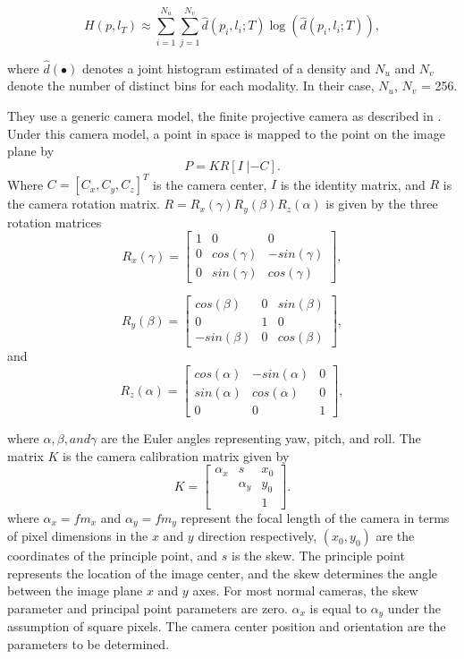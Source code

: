\begin{equation}
H(p, l_T) \approx  \sum_{i=1}^{N_u} \sum_{j=1}^{N_v} \hat{d}(p_i, l_i; T) \log (\hat{d}(p_i, l_i; T)),
\label{eq:C5:entropy_je}
\end{equation} 

where $\hat{d}(\bullet)$ denotes a joint histogram estimated of a density and $N_u$ and $N_v$ denote the number of distinct bins for each
modality. In their case, $N_u$, $N_v$ = 256.

They use a generic camera model, the finite projective camera as described in \cite{Hartley2004}. Under this camera model, a point in space is mapped to the point on the image plane by
\begin{equation}
P = KR[I \; | -\!C].
\label{eq:C5:cameramodel}
\end{equation}  
Where $C=[C_x,C_y,C_z]^T$ is the camera center, $I$ is the identity matrix, and $R$ is the camera rotation matrix. $R = R_x(\gamma)R_y(\beta)R_z(\alpha)$ is given by the three rotation matrices 
\[
 R_x(\gamma) = 
\begin{bmatrix}
1 & 0 & 0 \\
0 & cos(\gamma) & -sin(\gamma)    \\
0 & sin(\gamma) & cos(\gamma)
\end{bmatrix},
\]

\[
 R_y(\beta) = 
\begin{bmatrix}
cos(\beta) & 0 & sin(\beta) \\
0 & 1 & 0    \\
-sin(\beta) & 0 & cos(\beta)
\end{bmatrix},
\]
and
\[
 R_z(\alpha) = 
\begin{bmatrix}
cos(\alpha) & -sin(\alpha) & 0 \\
sin(\alpha) & cos(\alpha) & 0    \\
0 & 0 & 1
\end{bmatrix},
\]

where $\alpha, \beta, and  \gamma$ are the Euler angles representing yaw, pitch, and roll. The matrix $K$ is the camera calibration matrix given by
\begin{equation}
K = 
\begin{bmatrix}
\alpha_x &  s &  x_0 \\
& \alpha_y & y_0    \\
 &  & 1
\end{bmatrix}
\label{eq:C5:Kmatrix}.
\end{equation}  
where $\alpha_x = fm_x$ and $\alpha_y = fm_y$ represent the focal length of the camera in terms of pixel dimensions in the $x$ and $y$ direction respectively, $(x_0,y_0)$ are the coordinates of the principle point, and $s$ is the skew. The principle point represents the location of the image center, and the skew determines the angle between the image plane $x$ and $y$ axes. For most normal cameras, the skew parameter and principal point parameters are zero. $\alpha_x$ is equal to $\alpha_y$ under the assumption of square pixels. The camera center position and orientation are the parameters to be determined. 


